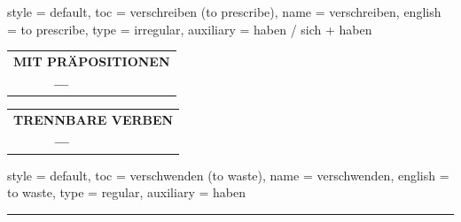 \begin{verbentry}{
  style = {default},
  toc = {verschreiben (to prescribe)},
  name = {verschreiben},
  english = {to prescribe},
  type = {irregular},
  auxiliary = {haben / sich + haben}
}
\vspace{10pt}

\begin{tabular}{lll}
\multicolumn{3}{l}{\textbf{MIT PRÄPOSITIONEN}}\\
& \textbf{---} & \\
\end{tabular}
\hfill
\begin{tabular}{lll}
\multicolumn{3}{l}{\textbf{TRENNBARE VERBEN}}\\
& \textbf{---} & \\
\end{tabular}
\vspace{-5pt}
\end{verbentry}

\begin{verbentry}{
  style = {default},
  toc = {verschwenden (to waste)},
  name = {verschwenden},
  english = {to waste},
  type = {regular},
  auxiliary = {haben}
}
 
    
     \vspace{5pt}

    \hrule
    
    \vspace{5pt}


\end{verbentry}
